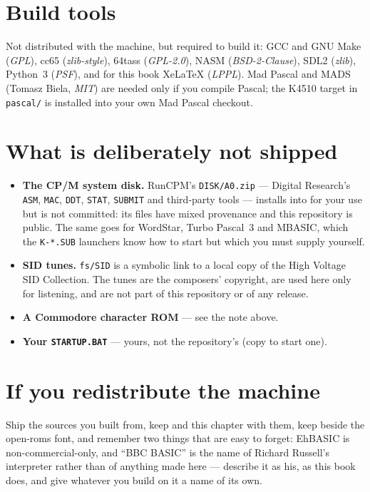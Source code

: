 \section{Build tools}
Not distributed with the machine, but required to build it: GCC and
GNU Make (\emph{GPL}), cc65 (\emph{zlib-style}), 64tass
(\emph{GPL-2.0}), NASM (\emph{BSD-2-Clause}), SDL2 (\emph{zlib}),
Python~3 (\emph{PSF}), and for this book XeLaTeX (\emph{LPPL}). Mad
Pascal and MADS (Tomasz Biela, \emph{MIT}) are needed only if you
compile Pascal; the K4510 target in \verb|pascal/| is installed into
your own Mad Pascal checkout.

\section{What is deliberately not shipped}
\begin{itemize}[leftmargin=1.4em]
\item \textbf{The CP/M system disk.} RunCPM's \verb|DISK/A0.zip| ---
  Digital Research's \verb|ASM|, \verb|MAC|, \verb|DDT|, \verb|STAT|,
  \verb|SUBMIT| and third-party tools --- installs into
   for your use but is not committed: its files have
  mixed provenance and this repository is public. The same goes for
  WordStar, Turbo Pascal~3 and MBASIC, which the \verb|K-*.SUB|
  launchers know how to start but which you must supply yourself.
\item \textbf{SID tunes.} \verb|fs/SID| is a symbolic link to a local
  copy of the High Voltage SID Collection. The tunes are the
  composers' copyright, are used here only for listening, and are not
  part of this repository or of any release.
\item \textbf{A Commodore character ROM} --- see the note above.
\item \textbf{Your \texttt{STARTUP.BAT}} --- yours, not the repository's
  (copy  to start one).
\end{itemize}

\section{If you redistribute the machine}
Ship the sources you built from, keep  and this
chapter with them, keep  beside the open-roms font,
and remember two things that are easy to forget: EhBASIC is
non-commercial-only, and ``BBC BASIC'' is the name of Richard Russell's
interpreter rather than of anything made here --- describe it as his,
as this book does, and give whatever you build on it a name of its own.
